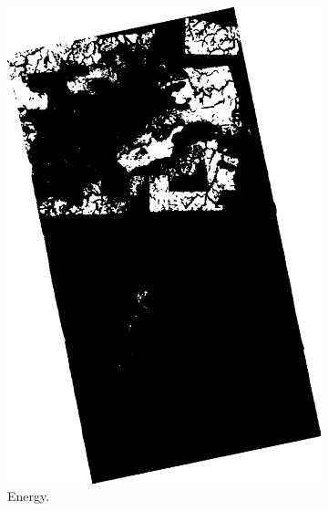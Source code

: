 \begin{figure}[H]\ContinuedFloat
  \centering
  \begin{subfigure}[b]{0.4\linewidth}
    \includegraphics[width=\linewidth]{Chapter4/sum_and_diff_textures/energyimage.png}
     \caption{Energy.}
  \end{subfigure}
  \centering
  \begin{subfigure}[b]{0.4\linewidth}

\end{subfigure}
\end{figure}
